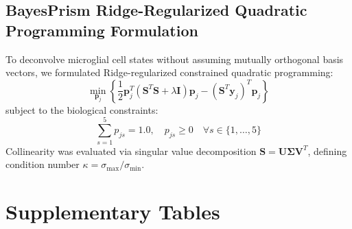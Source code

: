 \documentclass[10pt,a4paper]{article}
\begin{document}
\subsection{BayesPrism Ridge-Regularized Quadratic Programming Formulation}
To deconvolve microglial cell states without assuming mutually orthogonal basis vectors, we formulated Ridge-regularized constrained quadratic programming:
\begin{equation}
\min_{\mathbf{p}_j} \left\{ \frac{1}{2}\mathbf{p}_j^T (\mathbf{S}^T \mathbf{S} + \lambda \mathbf{I}) \mathbf{p}_j - (\mathbf{S}^T \mathbf{y}_j)^T \mathbf{p}_j \right\}
\end{equation}
subject to the biological constraints:
\begin{equation}
\sum_{s=1}^5 p_{js} = 1.0, \quad p_{js} \ge 0 \quad \forall s \in \{1,\dots,5\}
\end{equation}
Collinearity was evaluated via singular value decomposition $\mathbf{S} = \mathbf{U} \mathbf{\Sigma} \mathbf{V}^T$, defining condition number $\kappa = \sigma_{\max} / \sigma_{\min}$.

\clearpage
\section{Supplementary Tables}
\end{document}
